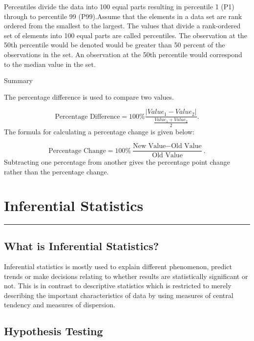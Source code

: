 \documentclass[
]{book}
\begin{document}
Percentiles divide the data into 100 equal parts resulting in percentile 1 (P1) through to percentile 99 (P99).Assume that the elements in a data set are rank ordered from the smallest to the largest. The values that divide a rank-ordered set of elements into 100 equal parts are called percentiles. The observation at the 50th percentile would be denoted would be greater than 50 percent of the observations in the set. An observation at the 50th percentile would correspond to the median value in the set.

Summary

The percentage difference is used to compare two values.

\[ \textrm{Percentage Difference} = 100\% \frac{|Value_1 - Value_2|}{\frac{Value_1+Value_2}{2}}.\]
The formula for calculating a percentage change is given below:

\[ \textrm{Percentage Change} = 100\% \frac{\textrm{New Value} - \textrm{Old Value}}{\textrm{Old Value}}.\]
Subtracting one percentage from another gives the percentage point change rather than the percentage change.

\hypertarget{infstat}{%
\chapter{Inferential Statistics}\label{infstat}}

\begin{center}\rule{0.5\linewidth}{0.5pt}\end{center}

\hypertarget{what-is-inferential-statistics}{%
\section{What is Inferential Statistics?}\label{what-is-inferential-statistics}}

Inferential statistics is mostly used to explain different phenomenon, predict trends or make decisions relating to whether results are statistically significant or not. This is in contrast to descriptive statistics which is restricted to merely describing the important characteristics of data by using measures of central tendency and measures of dispersion.

\hypertarget{hypothesis-testing}{%
\section{Hypothesis Testing}\label{hypothesis-testing}}
\end{document}
